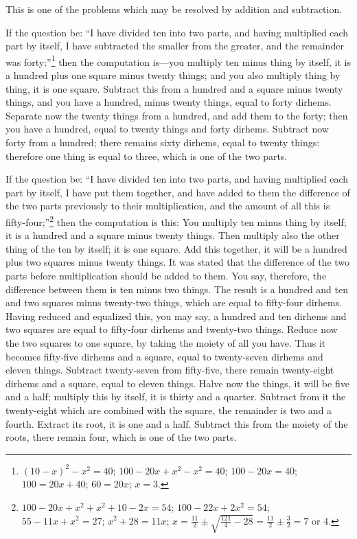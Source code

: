 This is one of the problems which may be resolved by addition and subtraction.

If the question be: ``I have divided ten into two parts, and having multiplied each part by itself, I have subtracted the smaller from the greater, and the remainder was forty;''\footnote{$(10-x)^2 - x^2 = 40$; $100 - 20x + x^2 - x^2 = 40$; $100 - 20x = 40$; $100 = 20x + 40$; $60 = 20x$; $x = 3$.} then the computation is---you multiply ten minus thing by itself, it is a hundred plus one square minus twenty things; and you also multiply thing by thing, it is one square. Subtract this from a hundred and a square minus twenty things, and you have a hundred, minus twenty things, equal to forty dirhems. Separate now the twenty things from a hundred, and add them to the forty; then you have a hundred, equal to twenty things and forty dirhems. Subtract now forty from a hundred; there remains sixty dirhems, equal to twenty things: therefore one thing is equal to three, which is one of the two parts.

If the question be: ``I have divided ten into two parts, and having multiplied each part by itself, I have put them together, and have added to them the difference of the two parts previously to their multiplication, and the amount of all this is fifty-four;''\footnote{$100 - 20x + x^2 + x^2 + 10 - 2x = 54$; $100 - 22x + 2x^2 = 54$; $55 - 11x + x^2 = 27$; $x^2 + 28 = 11x$; $x = \frac{11}{2} \pm \sqrt{\frac{121}{4} - 28} = \frac{11}{2} \pm \frac{3}{2} = 7$ or $4$.} then the computation is this: You multiply ten minus thing by itself; it is a hundred and a square minus twenty things. Then multiply also the other thing of the ten by itself; it is one square. Add this together, it will be a hundred plus two squares minus twenty things. It was stated that the difference of the two parts before multiplication should be added to them. You say, therefore, the difference between them is ten minus two things. The result is a hundred and ten and two squares minus twenty-two things, which are equal to fifty-four dirhems. Having reduced and equalized this, you may say, a hundred and ten dirhems and two squares are equal to fifty-four dirhems and twenty-two things. Reduce now the two squares to one square, by taking the moiety of all you have. Thus it becomes fifty-five dirhems and a square, equal to twenty-seven dirhems and eleven things. Subtract twenty-seven from fifty-five, there remain twenty-eight dirhems and a square, equal to eleven things. Halve now the things, it will be five and a half; multiply this by itself, it is thirty and a quarter. Subtract from it the twenty-eight which are combined with the square, the remainder is two and a fourth. Extract its root, it is one and a half. Subtract this from the moiety of the roots, there remain four, which is one of the two parts.

